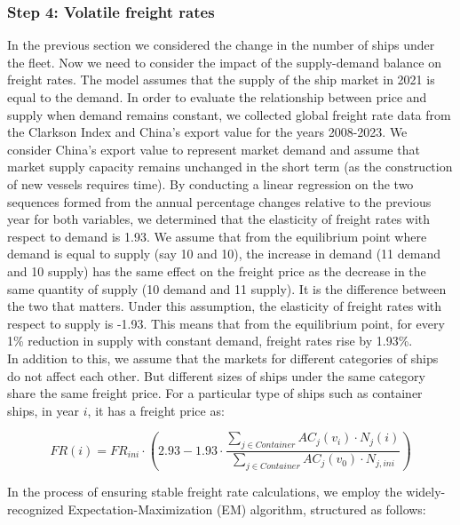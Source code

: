 \documentclass[a4paper,12pt]{article}
\begin{document}
\subsubsection{Step 4: Volatile freight rates}
In the previous section we considered the change in the number of ships under the fleet.
Now we need to consider the impact of the supply-demand balance on freight rates.
The model assumes that the supply of the ship market in 2021 is equal to the demand.
In order to evaluate the relationship between price and supply when demand remains constant, we collected global freight rate data from the Clarkson Index and China's export value for the years 2008-2023.
We consider China's export value to represent market demand and assume that market supply capacity remains unchanged in the short term (as the construction of new vessels requires time).
By conducting a linear regression on the two sequences formed from the annual percentage changes relative to the previous year for both variables, we determined that the elasticity of freight rates with respect to demand is 1.93.
We assume that from the equilibrium point where demand is equal to supply (say 10 and 10), the increase in demand (11 demand and 10 supply) has the same effect on the freight price as the decrease in the same quantity of supply (10 demand and 11 supply).
It is the difference between the two that matters.
Under this assumption, the elasticity of freight rates with respect to supply is -1.93.
This means that from the equilibrium point, for every 1\% reduction in supply with constant demand, freight rates rise by 1.93\%.\\

In addition to this, we assume that the markets for different categories of ships do not affect each other.
But different sizes of ships under the same category share the same freight price.
For a particular type of ships such as container ships, in year $i$, it has a freight price as:

\begin{equation}
	\label{eq:fr_mf}
	FR(i) = FR_{ini} \cdot \left (2.93 - 1.93 \cdot \frac{\sum_{j \in Container} AC_j(v_i) \cdot N_j(i)}{\sum_{j \in Container} AC_j(v_0) \cdot N_{j,ini}}\right )
\end{equation}


In the process of ensuring stable freight rate calculations, we employ the widely-recognized Expectation-Maximization (EM) algorithm, structured as follows:
\end{document}
